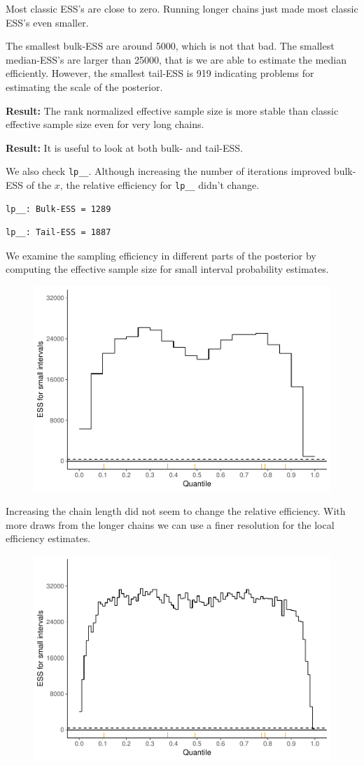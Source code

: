\documentclass[american,]{article}
\begin{document}
Most classic ESS's are close to zero. Running longer chains just made
most classic ESS's even smaller.

The smallest bulk-ESS are around 5000, which is not that bad. The
smallest median-ESS's are larger than 25000, that is we are able to
estimate the median efficiently. However, the smallest tail-ESS is 919
indicating problems for estimating the scale of the posterior.

\textbf{Result:} The rank normalized effective sample size is more
stable than classic effective sample size even for very long chains.

\textbf{Result:} It is useful to look at both bulk- and tail-ESS.

We also check \texttt{lp\_\_}. Although increasing the number of
iterations improved bulk-ESS of the \(x\), the relative efficiency for
\texttt{lp\_\_} didn't change.

\begin{verbatim}
lp__: Bulk-ESS = 1289
\end{verbatim}

\begin{verbatim}
lp__: Tail-ESS = 1887
\end{verbatim}

We examine the sampling efficiency in different parts of the posterior
by computing the effective sample size for small interval probability
estimates.

\begin{figure}[t]
  \centering
  \includegraphics[width=0.6\linewidth]{graphics/local-ess-fit-nom-td20l-1.pdf}
\end{figure}

Increasing the chain length did not seem to change the relative
efficiency. With more draws from the longer chains we can use a finer
resolution for the local efficiency estimates.

\begin{figure}[t]
  \centering
  \includegraphics[width=0.6\linewidth]{graphics/local-ess-fit-nom-td20l-finer-1.pdf}
\end{figure}
\end{document}
